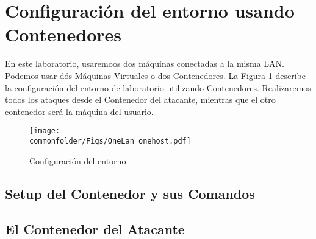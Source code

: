 \section{Configuración del entorno usando Contenedores} 

En este laboratorio, usaremoos dos máquinas conectadas a la misma LAN. Podemos usar dós Máquinas Virtuales o dos Contenedores. 
La Figura \ref{fig:labsetup} describe la configuración del entorno de laboratorio utilizando Contenedores.
Realizaremos todos los ataques desde el Contenedor del atacante, mientras que el otro contenedor será la máquina del usuario.

\begin{figure}[htb]
\begin{center}
\texttt{[image: \\commonfolder/Figs/OneLan\_onehost.pdf]}
\end{center}
\caption{Configuración del entorno}
\label{fig:labsetup}
\end{figure}
 

%
 


\subsection{Setup del Contenedor y sus Comandos} 




\subsection{El Contenedor del Atacante}

